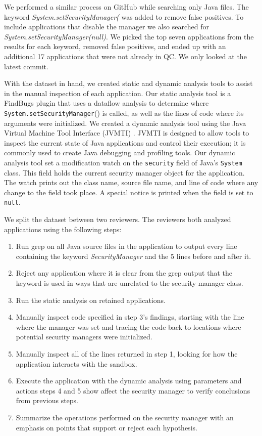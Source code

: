 \documentclass{sig-alternate}
\begin{document}
We performed a similar process on GitHub while searching only Java files. The keyword \textit{System.setSecurityManager(} was added to remove false positives. To include applications that disable the manager we also searched for \textit{System.setSecurityManager(null)}. We picked the top seven applications from the results for each keyword, removed false positives, and ended up with an additional 17 applications that were not already in QC. We only looked at the latest commit.

With the dataset in hand, we created static and dynamic analysis tools
to assist in the manual inspection of each application. Our static
analysis tool is a FindBugs \cite{hovemeyer_finding_2004} plugin
that uses a dataflow analysis to determine where \texttt{System.setSecurityManager}()
is called, as well as the lines of code where its arguments were initialized.
We created a dynamic analysis tool using the Java Virtual Machine
Tool Interface (JVMTI) \cite{_jvmti}. JVMTI is designed to allow
tools to inspect the current state of Java applications and control
their execution; it is commonly used to create Java debugging and
profiling tools. Our dynamic analysis tool set a modification watch
on the \texttt{security} field of Java's \texttt{System} class. This
field holds the current security manager object for the application.
The watch prints out the class name, source file name, and line of
code where any change to the field took place. A special notice is
printed when the field is set to \texttt{null}. 

We split the dataset between two reviewers. The reviewers both analyzed
applications using the following steps:

\begin{enumerate}
\item Run grep on all Java source files in the application
to output every line containing the keyword \textsl{SecurityManager} and the 5 lines before and after it.
\item Reject any application where it is clear from the grep output that the keyword is used in ways that are unrelated to the security manager class.
\item Run the static analysis on retained applications. 
\item Manually inspect code specified in step 3's findings,
starting with the line where the manager was set and tracing the code
back to locations where potential security
managers were initialized. 
\item Manually inspect all of the lines returned in step 1, looking for how the application interacts with
the sandbox. 
\item Execute the application with the dynamic analysis using parameters
and actions steps 4 and 5 show affect the security
manager to verify conclusions from previous steps.
\item Summarize the operations performed
on the security manager with an emphasis on points that support or
reject each hypothesis.
\end{enumerate}
\end{document}
